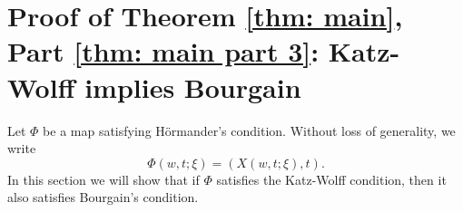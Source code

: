 \documentclass{article}
\numberwithin{equation}{section}
\theoremstyle{plain}
\begin{document}
\section{Proof of Theorem \ref{thm: main}, Part \ref{thm: main part 3}: Katz-Wolff  implies Bourgain}\label{251003secc5}


Let $\Phi$ be a map satisfying H\"ormander's condition. Without loss of generality, we write 
\begin{equation}
\Phi(w, t; \xi)= (X(w, t; \xi), t).
\end{equation}
In this section we will show that if $\Phi$ satisfies the Katz-Wolff condition, then it also satisfies Bourgain's condition. \\
\end{document}
